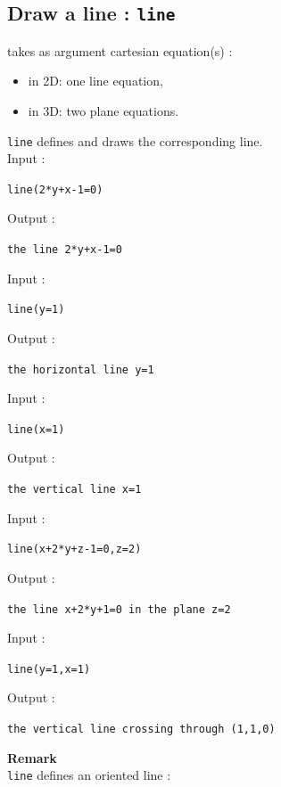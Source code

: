 \documentclass[a4paper,11pt]{book}
\begin{document}
\subsection{Draw a line : {\tt line}}\label{sec:doite}
 takes as argument cartesian equation(s) :
\begin{itemize}
\item in 2D: one line equation,
\item in 3D: two plane equations.
\end{itemize}
{\tt line} defines and draws the corresponding line.\\
Input :
\begin{center}{\tt line(2*y+x-1=0)}\end{center}
Output :
\begin{center}{\tt the line 2*y+x-1=0}\end{center}
Input :
\begin{center}{\tt line(y=1)}\end{center}
Output :
\begin{center}{\tt the horizontal line y=1}\end{center}
Input :
\begin{center}{\tt line(x=1)}\end{center}
Output :
\begin{center}{\tt the vertical line x=1}\end{center}
Input :
\begin{center}{\tt line(x+2*y+z-1=0,z=2)}\end{center}
Output :
\begin{center}{\tt the line x+2*y+1=0 in the plane z=2}\end{center}
Input :
\begin{center}{\tt line(y=1,x=1)}\end{center}
Output :
\begin{center}{\tt the vertical line crossing through (1,1,0)}\end{center}
{\bf Remark}\\
{\tt line} defines an oriented line :
\end{document}
